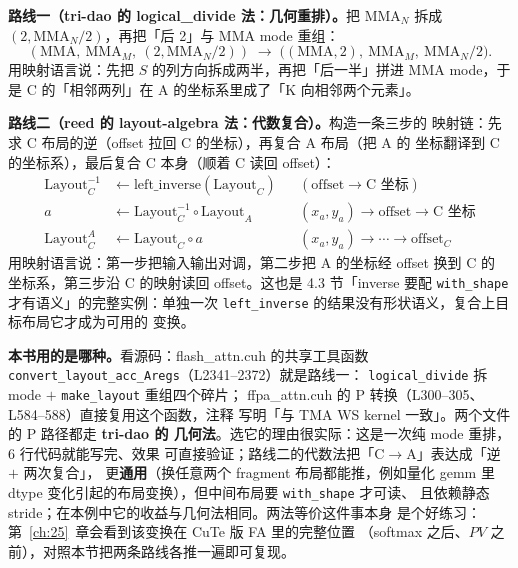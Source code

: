 \textbf{路线一（tri-dao 的 logical\_divide 法：几何重排）。}把
$\mathrm{MMA}_N$ 拆成 $(2,\mathrm{MMA}_N/2)$，再把「后 2」与 MMA mode
重组：
\begin{equation}
  (\mathrm{MMA},\ \mathrm{MMA}_M,\ (2,\mathrm{MMA}_N/2))
  \;\longrightarrow\;
  \bigl((\mathrm{MMA},2),\ \mathrm{MMA}_M,\ \mathrm{MMA}_N/2\bigr) .
  \label{eq:20-fa2-tri}
\end{equation}
用映射语言说：先把 $S$ 的列方向拆成两半，再把「后一半」拼进
MMA mode，于是 C 的「相邻两列」在 A 的坐标系里成了「K 向相邻两个元素」。

\textbf{路线二（reed 的 layout-algebra 法：代数复合）。}构造一条三步的
映射链：先求 C 布局的逆（offset 拉回 C 的坐标），再复合 A 布局（把 A 的
坐标翻译到 C 的坐标系），最后复合 C 本身（顺着 C 读回 offset）：
\begin{align}
  \mathrm{Layout}_C^{-1} &\leftarrow \mathrm{left\_inverse}(\mathrm{Layout}_C)
    && (\mathrm{offset} \to \text{C 坐标}) \label{eq:20-fa2-reed1} \\
  a &\leftarrow \mathrm{Layout}_C^{-1} \circ \mathrm{Layout}_A
    && (x_a,y_a) \to \mathrm{offset} \to \text{C 坐标} \label{eq:20-fa2-reed2} \\
  \mathrm{Layout}_C^{A} &\leftarrow \mathrm{Layout}_C \circ a
    && (x_a,y_a) \to \cdots \to \mathrm{offset}_C \label{eq:20-fa2-reed3}
\end{align}
用映射语言说：第一步把输入输出对调，第二步把 A 的坐标经 offset 换到 C 的
坐标系，第三步沿 C 的映射读回 offset。这也是 4.3 节「inverse 要配
\texttt{with\_shape} 才有语义」的完整实例：单独一次
\texttt{left\_\allowbreak{}inverse} 的结果没有形状语义，复合上目标布局它才成为可用的
变换。

\textbf{本书用的是哪种。}看源码：flash\_attn.cuh 的共享工具函数
\texttt{convert\_\allowbreak{}layout\_\allowbreak{}acc\_\allowbreak{}Aregs}（L2341--2372）就是路线一：
\texttt{logical\_\allowbreak{}divide} 拆 mode $+$ \texttt{make\_layout} 重组四个碎片；
ffpa\_attn.cuh 的 P 转换（L300--305、L584--588）直接复用这个函数，注释
写明「与 TMA WS kernel 一致」。两个文件的 P 路径都走 \textbf{tri-dao 的
几何法}。选它的理由很实际：这是一次纯 mode 重排，6 行代码就能写完、效果
可直接验证；路线二的代数法把「C$\to$A」表达成「逆 $+$ 两次复合」，
更\textbf{通用}（换任意两个 fragment 布局都能推，例如量化 gemm 里
dtype 变化引起的布局变换），但中间布局要 \texttt{with\_shape} 才可读、
且依赖静态 stride；在本例中它的收益与几何法相同。两法等价这件事本身
是个好练习：第~\ref{ch:25}~章会看到该变换在 CuTe 版 FA 里的完整位置
（softmax 之后、$PV$ 之前），对照本节把两条路线各推一遍即可复现。

